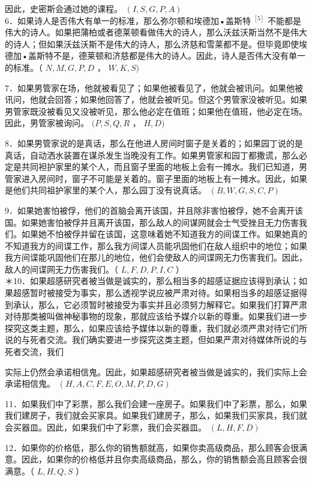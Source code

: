 因此，史密斯会通过她的课程。 $(I, S, G, P, A)$\\
6．如果诗人是否伟大有单一的标准，那么弥尔顿和埃德加•盖斯特 ${ }^{[5]}$ 不能都是伟大的诗人。如果把蒲柏或者德莱顿看做伟大的诗人，那么沃兹沃斯当然不是伟大的诗人；但如果沃兹沃斯不是伟大的诗人，那么济慈和雪莱都不是。但毕竟即使埃德加•盖斯特不是，德莱顿和济慈都是伟大的诗人。因此，诗人是否伟大没有单一的标准。（ $N, M, G, P, D$ ， $W, K, S)$

7．如果男管家在场，他就被看见了；如果他被看见了，他就会被讯问。如果他被讯问，他就会回答；如果他回答了，他就会被听见。但这个男管家没被听见。如果男管家既没被看见又没被听见，那么他必定在值班；如果他在值班，他必定在场。因此，男管家被询问。 $(P, S, Q, R$ ， $H, D)$

8．如果男管家说的是真话，那么在他进人房间时窗子是关着的；如果园丁说的是真话，自动洒水装置在谋杀发生当晚没有工作。如果男管家和园丁都撒谎，那么必定是共同袒护家里的某个人，而且窗子里面的地板上会有一摊水。我们已知道，男管家进入房间时，窗子不可能是关着的。窗子里面的地板上有一摊水。因此，如果是他们共同祖护家里的某个人，那么园丁没有说真话。 $(B, W, G, S, C, P)$

9．如果她害怕被俘，他们的首脑会离开该国，并且除非害怕被俘，她不会离开该国。如果她害怕被俘并且离开该国，那么敌人的间谋网就会士气受挫且无力伤害我们。如果她不怕被俘并留在该国，这意味着她不知道我方的间谍工作。如果她真的不知道我方的间谍工作，那么我方间谍人员能巩固他们在敌人组织中的地位；如果我方间谍能巩固他们在那儿的地位，他们会使敌人的间谍网无力伤害我们。因此，敌人的间谍网无力伤害我们。（ $L, F, D, P, I, C$ ）\\
＊10．如果超感研究者被当做是诚实的，那么相当多的超感证据应该得到承认；如果超感暂时被接受为事实，那么透视学说应被严肃对待。如果相当多的超感证据得到承认，那么，它必须暂时被接受为事实并且必须努力解释它。如果我们打算严肃对待那类被叫做神秘事物的现象，那就应该给予媒介以新的尊重。如果我们进一步探究这类主题，那么，如果应该给予媒体以新的尊重，我们就必须严肃对待它们所说的与死者交流。我们确实要进一步探究这类主题，但如果严肃对待媒体所说的与死者交流，我们

实际上仍然会承诺相信鬼。因此，如果超感研究者被当做是诚实的，我们实际上会承诺相信鬼。 $(H, A, C, F, E, O, M, P, D, G)$

11．如果我们中了彩票，那么我们会建一座房子。如果我们中了彩票，那么，如果我们建房子，我们就会买家具。如果我们建房子，那么，如果我们买家具，我们就会买器皿。因此，如果我们中了彩票，我们会买器皿。 $(L, H, F, D)$

12．如果你的价格低，那么你的销售额就高，如果你卖高级商品，那么顾客会很满意。因此，如果你的价格低并且你卖高级商品，那么，你的销售额会高且顾客会很满意。（ $L, H, Q, S$ ）

